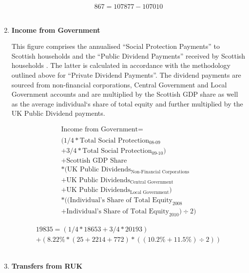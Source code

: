 \begin{enumerate}
\begin{equation} \nonumber
867 = 107877-107010
\end{equation}\\

\item \textbf {Income from Government}

This figure comprises the annualised ``Social Protection Payments'' to Scottish households \cite{ScotGov2013b} and the ``Public Dividend Payments'' received by Scottish households \cite{ONS2011c}. The latter is calculated in accordance with the methodology outlined above for ``Private Dividend Payments''. The dividend payments are sourced from non-financial corporations, Central Government and Local Government accounts and are multiplied by the Scottish GDP share as well as the average individual`s share of total equity and further multiplied by the UK Public Dividend payments.  

\begin{equation}
\begin{split}
\text{Income from Government} =  \\ \\
(1/4*\text{Total Social Protection}_\text{08-09}\\
+3/4*\text{Total Social Protection}_\text{09-10})\\
+\text{Scottish GDP Share} \\
*(\text{UK Public Dividends}_\text{Non-Financial Corporations}\\
+\text{UK Public Dividends}_\text{Central Government}\\
+\text{UK Public Dividends}_\text{Local Government})\\
*((\text{Individual's Share of Total Equity}_\text{2008}\\
+\text{Individual's Share of Total Equity}_\text{2010})\div 2)
\end{split} \label{eq:2.5.8}
\end{equation}


\begin{equation} \nonumber
\begin{split}
19835 = (1/4*18653+3/4*20193)\\
+(8.22\%*(25+2214+772)*((10.2\%+11.5\%)\div 2))
\end{split}
\end{equation}\\


\item \textbf {Transfers from RUK}


\end{enumerate}
